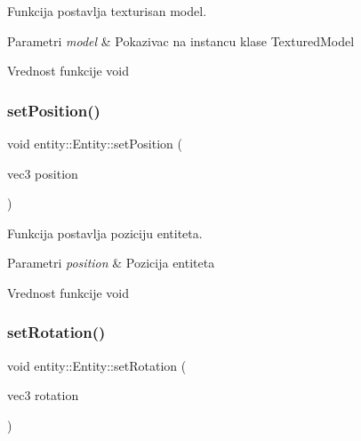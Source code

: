 Funkcija postavlja texturisan model. 


\begin{DoxyParams}{Parametri}
{\em model} & Pokazivac na instancu klase Textured\+Model \\
\hline
\end{DoxyParams}
\begin{DoxyReturn}{Vrednost funkcije}
void 
\end{DoxyReturn}
\mbox{\label{classentity_1_1Entity_abb5f477d3eac07d19f0545df10e3077c}} 
\subsubsection{\texorpdfstring{set\+Position()}{setPosition()}}
{\footnotesize\ttfamily void entity\+::\+Entity\+::set\+Position (\begin{DoxyParamCaption}\item[{vec3}]{position }\end{DoxyParamCaption})}



Funkcija postavlja poziciju entiteta. 


\begin{DoxyParams}{Parametri}
{\em position} & Pozicija entiteta \\
\hline
\end{DoxyParams}
\begin{DoxyReturn}{Vrednost funkcije}
void 
\end{DoxyReturn}
\mbox{\label{classentity_1_1Entity_a830cb1b8769d11322844a34f1e480e4b}} 
\subsubsection{\texorpdfstring{set\+Rotation()}{setRotation()}}
{\footnotesize\ttfamily void entity\+::\+Entity\+::set\+Rotation (\begin{DoxyParamCaption}\item[{vec3}]{rotation }\end{DoxyParamCaption})}




